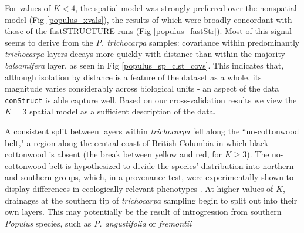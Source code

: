 \documentclass[12pt]{article}
\newcommand{\tri}{\textit{trichocarpa}}
\newcommand{\bals}{\textit{balsamifera}}
\begin{document}
For values of $K<4$, the spatial model was strongly preferred over the nonspatial model (Fig \ref{populus_xvals}),
the results of which were broadly concordant with those of the fastSTRUCTURE runs (Fig \ref{populus_fastStr}).
Most of this signal seems to derive from the \textit{P. trichocarpa} samples:
covariance within predominantly \tri{} layers decays more quickly with distance
than within the majority \bals{} layer, as seen in Fig \ref{populus_sp_clst_covs}.  
This indicates that, although isolation by distance is a feature of the dataset as a whole, 
its magnitude varies considerably across biological units - 
an aspect of the data \texttt{conStruct} is able capture well.
Based on our cross-validation results we view the $K=3$ spatial model 
as a sufficient description of the data. 

A consistent split between layers within \tri{} fell along the ``no-cottonwood belt," 
a region along the central coast of British Columbia in which black
cottonwood is absent (the break between yellow and red, for $K \geq 3$). 
The no-cottonwood belt is hypothesized to divide the species' distribution 
into northern and southern groups, which, in a provenance test, 
were experimentally shown to display differences in ecologically relevant phenotypes 
\citep[e.g., pathogen resistance,][]{xie2009,xie2012}.  
At higher values of $K$, drainages at the southern tip of \tri{} sampling 
begin to split out into their own layers.  
This may potentially be the result of introgression from southern \textit{Populus} species, 
such as \textit{P. angustifolia} or \textit{fremontii} \citep{Zhou2012,geraldes_etal_2014}
\end{document}
